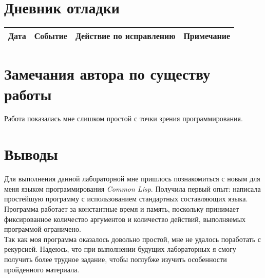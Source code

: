 \documentclass[12pt]{article}
\begin{document}
\section{Дневник отладки}
\begin{tabular}{|c|c|c|c|}
\hline
Дата & Событие & Действие по исправлению & Примечание \\
\hline
\end{tabular}

\section{Замечания автора по существу работы}
Работа показалась мне слишком простой с точки зрения программирования. 

\section{Выводы}
Для выполнения данной лабораторной мне пришлось познакомиться с новым для меня языком программирования {\it Common Lisp}. Получила первый опыт: написала простейшую программу с использованием стандартных составляющих языка.\\
Программа работает за константные время и память, поскольку принимает фиксированное количество аргументов и количество действий, выполняемых программой ограничено.\\
Так как моя программа оказалось довольно простой, мне не удалось поработать с рекурсией. Надеюсь, что при выполнении будущих лабораторных я смогу получить более трудное задание, чтобы поглубже изучить особенности пройденного материала.
\end{document}
